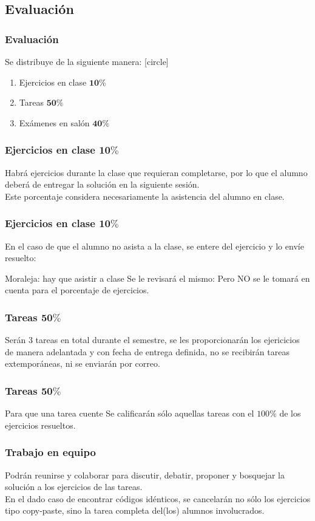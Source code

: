 \documentclass[12pt]{beamer}
\begin{document}
\subsection{Evaluación}
\begin{frame}
\frametitle{Evaluación}
Se distribuye de la siguiente manera:
[circle]
\begin{enumerate}[<+->]
\item Ejercicios en clase $\mathbf{10\%}$
\item Tareas $\mathbf{50\%}$
\item Exámenes en salón $\mathbf{40\%}$
\end{enumerate}
\end{frame}
\begin{frame}
\frametitle{Ejercicios en clase $\mathbf{10\%}$}
Habrá ejercicios durante la clase que requieran completarse, por lo que el alumno deberá de entregar la solución en la siguiente sesión.
\\
\bigskip
\pause
Este porcentaje considera necesariamente la asistencia del alumno en clase.
\end{frame}
\begin{frame}
\frametitle{Ejercicios en clase $\mathbf{10\%}$}
En el caso de que el alumno no asista a la clase, se entere del ejercicio y lo envíe resuelto:
\pause
\begin{alertblock}{Moraleja: hay que asistir a clase}
Se le revisará el mismo: Pero NO se le tomará en cuenta para el porcentaje de ejercicios.
\end{alertblock}
\end{frame}
\begin{frame}
\frametitle{Tareas $\mathbf{50\%}$}
Serán 3 tareas en total durante el semestre, se les proporcionarán los ejericicios de manera adelantada y con fecha de entrega definida, no se recibirán tareas extemporáneas, ni se enviarán por correo.
\end{frame}
\begin{frame}
\frametitle{Tareas $\mathbf{50\%}$}
\begin{exampleblock}{Para que una tarea cuente}
Se calificarán sólo aquellas tareas con el $100\%$ de los ejercicios resueltos.
\end{exampleblock} 
\end{frame}
\begin{frame}
\frametitle{Trabajo en equipo}
Podrán reunirse y colaborar para discutir, debatir, proponer y bosquejar la solución a los ejercicios de las tareas.
\\
\bigskip
En el dado caso de encontrar códigos idénticos, se cancelarán no sólo los ejercicios tipo copy-paste, sino la tarea completa del(los) alumnos involucrados.
\end{frame}
\end{document}
